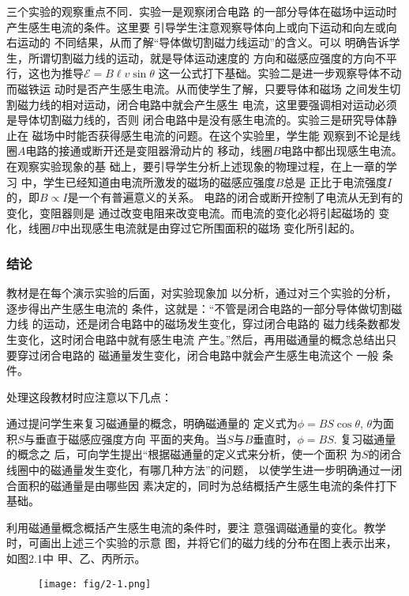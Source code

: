三个实验的观察重点不同．实验一是观察闭合电路
的一部分导体在磁场中运动时产生感生电流的条件。这里要
引导学生注意观察导体向上或向下运动和向左或向右运动的
不同结果，从而了解“导体做切割磁力线运动”的含义。可以
明确告诉学生，所谓切割磁力线的运动，就是导体运动速度的
方向和磁感应强度的方向不平行，这也为推导$\mathcal{E}=B\ell v\sin\theta$
这一公式打下基础。实验二是进一步观察导体不动而磁铁运
动时是否产生感生电流。从而使学生了解，只要导体和磁场
之间发生切割磁力线的相对运动，闭合电路中就会产生感生
电流，这里要强调相对运动必须是导体切割磁力线的，否则
闭合电路中是没有感生电流的。实验三是研究导体静止在
磁场中时能否获得感生电流的问题。在这个实验里，学生能
观察到不论是线圈$A$电路的接通或断开还是变阻器滑动片的
移动，线圈$B$电路中都出现感生电流。在观察实验现象的基
础上，要引导学生分析上述现象的物理过程，在上一章的学习
中，学生已经知道由电流所激发的磁场的磁感应强度$B$总是
正比于电流强度$I$的，即$B\propto I$是一个有普遍意义的关系。
电路的闭合或断开控制了电流从无到有的变化，变阻器则是
通过改变电阻来改变电流。而电流的变化必将引起磁场的
变化，线圈$B$中出现感生电流就是由穿过它所围面积的磁场
变化所引起的。

\subsubsection{结论}

教材是在每个演示实验的后面，对实验现象加
以分析，通过对三个实验的分析，逐步得出产生感生电流的
条件，这就是：“不管是闭合电路的一部分导体做切割磁力线
的运动，还是闭合电路中的磁场发生变化，穿过闭合电路的
磁力线条数都发生变化，这时闭合电路中就有感生电流
产生。”然后，再用磁通量的概念总结出只要穿过闭合电路的
磁通量发生变化，闭合电路中就会产生感生电流这个 一般
条件。

处理这段教材时应注意以下几点：

通过提问学生来复习磁通量的概念，明确磁通量的
定义式为$\phi=BS\cos\theta$, $\theta$为面积$S$与垂直于磁感应强度方向
平面的夹角。当$S$与$B$垂直时，$\phi=BS$. 复习磁通量的概念之
后，可向学生提出“根据磁通量的定义式来分析，使一个面积
为$S$的闭合线圈中的磁通量发生变化，有哪几种方法”的问题，
以使学生进一步明确通过一闭合面积的磁通量是由哪些因
素决定的，同时为总结概括产生感生电流的条件打下基础。

利用磁通量概念概括产生感生电流的条件时，要注
意强调磁通量的变化。教学时，可画出上述三个实验的示意
图，并将它们的磁力线的分布在图上表示出来，如图2.1中
甲、乙、丙所示。
\begin{figure}[htp]
    \centering
\texttt{[image: fig/2-1.png]}    
    \caption{}
\end{figure}

